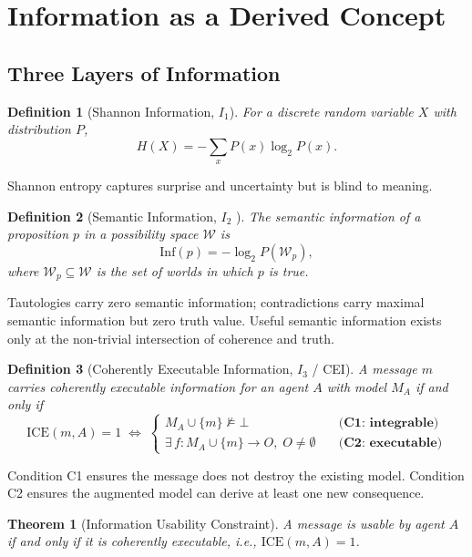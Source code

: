 \documentclass{article}
\newcommand{\ICE}{\mathrm{ICE}}
\newcommand{\Inf}{\mathrm{Inf}}
\newcommand{\MA}{M_A}
\newtheorem{theorem}{Theorem}
\newtheorem{definition}{Definition}
\begin{document}
\section{Information as a Derived Concept}
\label{sec:information}

\subsection{Three Layers of Information}

\begin{definition}[Shannon Information, $I_1$]
For a discrete random variable $X$ with distribution $P$,
\[
  H(X) = -\sum_{x} P(x) \log_2 P(x).
\]
\end{definition}

Shannon entropy captures surprise and uncertainty but is blind to meaning.

\begin{definition}[Semantic Information, $I_2$ {\normalfont\cite{carnap1953}}]
The semantic information of a proposition $p$ in a possibility space
$\mathcal{W}$ is
\[
  \Inf(p) = -\log_2 P(\mathcal{W}_p),
\]
where $\mathcal{W}_p \subseteq \mathcal{W}$ is the set of worlds in which $p$
is true.
\end{definition}

Tautologies carry zero semantic information; contradictions carry maximal
semantic information but zero truth value.  Useful semantic information exists
only at the non-trivial intersection of coherence and truth.

\begin{definition}[Coherently Executable Information, $I_3$ / CEI]
\label{def:cei}
A message $m$ carries \emph{coherently executable information} for an agent $A$
with model $\MA$ if and only if
\[
  \ICE(m, A) = 1 \;\iff\;
  \begin{cases}
    \MA \cup \{m\} \not\models \bot
      & \quad \textbf{(C1: integrable)} \\
    \exists\, f : \MA \cup \{m\} \to O,\; O \neq \emptyset
      & \quad \textbf{(C2: executable)}
  \end{cases}
\]
\end{definition}

Condition C1 ensures the message does not destroy the existing model.
Condition C2 ensures the augmented model can derive at least one new
consequence.

\begin{theorem}[Information Usability Constraint]
\label{thm:usability}
A message is usable by agent $A$ if and only if it is coherently executable,
i.e., $\ICE(m,A) = 1$.
\end{theorem}
\end{document}
